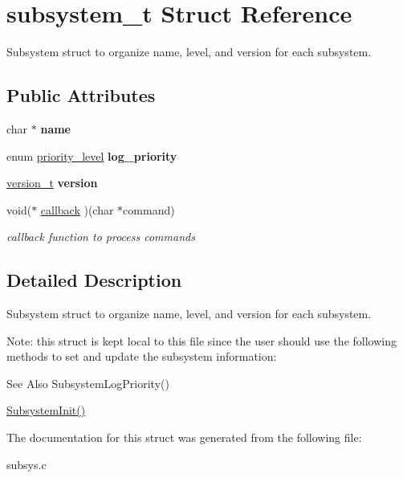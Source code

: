 \hypertarget{structsubsystem__t}{\section{subsystem\+\_\+t Struct Reference}
\label{structsubsystem__t}
}


Subsystem struct to organize name, level, and version for each subsystem.  


\subsection*{Public Attributes}
\begin{DoxyCompactItemize}
\item 
\hypertarget{structsubsystem__t_af1982aa3d0990166b5ec749876edd57d}{char $\ast$ {\bfseries name}}\label{structsubsystem__t_af1982aa3d0990166b5ec749876edd57d}

\item 
\hypertarget{structsubsystem__t_a90f0ad2bc6a45bb19a6417a2b34f6819}{enum \hyperlink{group__subsys_ga1d309594956a828563f9181d766daa08}{priority\+\_\+level} {\bfseries log\+\_\+priority}}\label{structsubsystem__t_a90f0ad2bc6a45bb19a6417a2b34f6819}

\item 
\hypertarget{structsubsystem__t_a7b204ad325e77d04bec21fa73bed8b20}{\hyperlink{unionversion__t}{version\+\_\+t} {\bfseries version}}\label{structsubsystem__t_a7b204ad325e77d04bec21fa73bed8b20}

\item 
\hypertarget{structsubsystem__t_aa55580db1d98cc8a0e869b8b5a7a713a}{void($\ast$ \hyperlink{structsubsystem__t_aa55580db1d98cc8a0e869b8b5a7a713a}{callback} )(char $\ast$command)}\label{structsubsystem__t_aa55580db1d98cc8a0e869b8b5a7a713a}

\begin{DoxyCompactList}\small\item\em callback function to process commands \end{DoxyCompactList}\end{DoxyCompactItemize}


\subsection{Detailed Description}
Subsystem struct to organize name, level, and version for each subsystem. 

Note\+: this struct is kept local to this file since the user should use the following methods to set and update the subsystem information\+: \begin{DoxySeeAlso}{See Also}
Subsystem\+Log\+Priority() 

\hyperlink{group__subsys_ga4cb5a7bc96bce54eaedba65a8f4847b5}{Subsystem\+Init()} 
\end{DoxySeeAlso}


The documentation for this struct was generated from the following file\+:\begin{DoxyCompactItemize}
\item 
subsys.\+c\end{DoxyCompactItemize}
